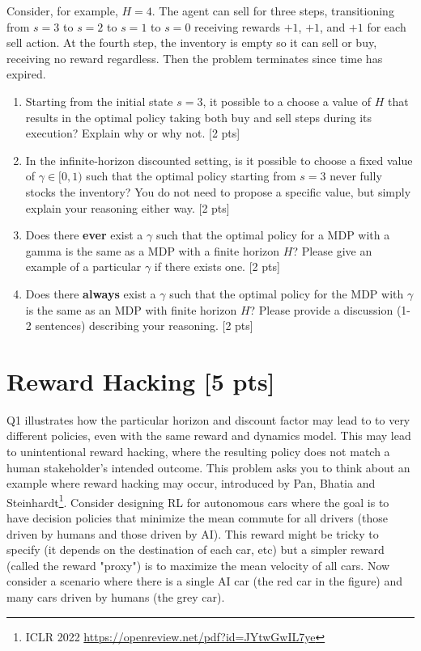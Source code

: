 \documentclass[11pt]{article}
\begin{document}
\noindent Consider, for example, $H = 4$. The agent can sell for three steps, transitioning from $s = 3$ to $s = 2$ to $s = 1$ to $s = 0$ receiving rewards $+1$, $+1$, and $+1$ for each sell action. At the fourth step, the inventory is empty so it can sell or buy, receiving no reward regardless. Then the problem terminates since time has expired.

\begin{enumerate}[label=(\alph*)]
    \item Starting from the initial state $s = 3$, it possible to a choose a value of $H$ that results in the optimal policy taking both buy and sell steps during its execution? Explain why or why not. [2 pts]
    \newpage

    \item In the infinite-horizon discounted setting, is it possible to choose a fixed value of $\gamma \in [0, 1)$ such that the optimal policy starting from $s = 3$ never fully stocks the inventory? You do not need to propose a specific value, but simply explain your reasoning either way. [2 pts]
    \newpage

    \item Does there \textbf{ever} exist a $\gamma$ such that the optimal policy for a MDP with a gamma is the same as a MDP with a finite horizon $H$? Please give an example of a particular $\gamma$ if there exists one. [2 pts]
    \newpage

    \item Does there \textbf{always} exist a $\gamma$ such that the optimal policy for the MDP with $\gamma$ is the same as an MDP with finite horizon $H$? Please provide a discussion (1-2 sentences) describing your reasoning. [2 pts]
    \newpage

    
\end{enumerate}

\pagebreak

\section{Reward Hacking [5 pts]} 
Q1  illustrates how the particular  horizon and discount factor may lead to 
    to very different policies, even with the same reward and dynamics model. This may lead to unintentional reward hacking, where the resulting policy does not match a human stakeholder's intended outcome. This problem asks you to think about an example where reward hacking may occur, introduced by Pan, Bhatia and Steinhardt\footnote{ICLR 2022 \url{https://openreview.net/pdf?id=JYtwGwIL7ye}}. Consider designing RL for autonomous cars where the goal is to have decision policies that minimize the mean commute for all drivers (those driven by humans and those driven by AI). This reward might be tricky to specify (it depends on the destination of each car, etc) but a simpler reward (called the reward "proxy") is to maximize the mean velocity of all cars. Now consider a scenario where there is a single AI car (the red car in the figure) and many cars driven by humans (the grey car). 
\end{document}
